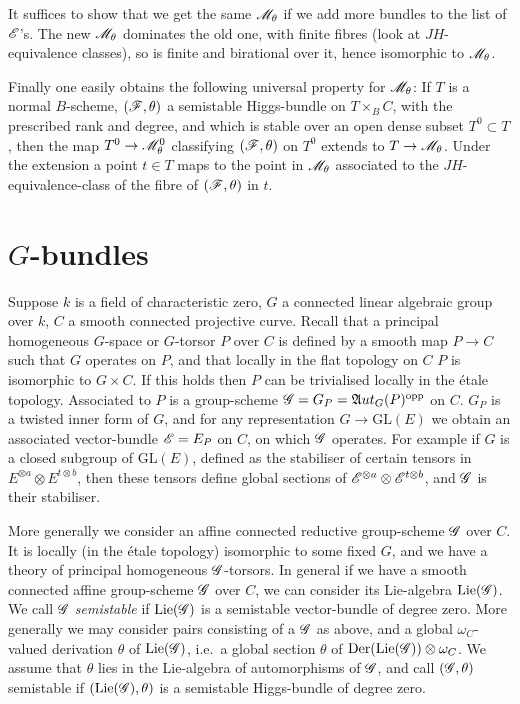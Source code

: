 \documentclass[12pt,english]{smfart}
\theoremstyle{plain} \newtheorem{innerthm}{Theorem} \newtheorem{innerlem}{Lemma} \newtheorem{innerprop}{Proposition} \newtheorem{innercor}{Corollary} \theoremstyle{definition} \newtheorem{innerdefn}{Definition} \newtheorem{innerconstr}{Construction} \theoremstyle{remark} \newtheorem*{remark}{Remark} \newtheorem*{remarks}{Remarks} \newtheorem*{applications}{Applications}
\begin{document}
It suffices to show that we get the same $\mathscr{M}_\theta$ if we add more bundles to the list of $\mathscr{E}$'s. The new $\mathscr{M}_\theta$ dominates the old one, with finite fibres (look at $JH$-equivalence classes), so is finite and birational over it, hence isomorphic to $\mathscr{M}_\theta$.

Finally one easily obtains the following universal property for $\mathscr{M}_\theta$: If $T$ is a normal $B$-scheme, $(\mathscr{F},\theta)$ a semistable Higgs-bundle on $T\times_B C$, with the prescribed rank and degree, and which is stable over an open dense subset $T^0\subset T$, then the map $T^0\to\mathscr{M}_\theta^0$ classifying $(\mathscr{F},\theta)$ on $T^0$ extends to $T\to\mathscr{M}_\theta$. Under the extension a point $t\in T$ maps to the point in $\mathscr{M}_\theta$ associated to the $JH$-equivalence-class of the fibre of $(\mathscr{F},\theta)$ in $t$.

\section{\texorpdfstring{$G$}{G}-bundles}\label{sec:II}

Suppose $k$ is a field of characteristic zero, $G$ a connected linear algebraic group over $k$, $C$ a smooth connected projective curve. Recall that a principal homogeneous $G$-space or $G$-torsor $P$ over $C$ is defined by a smooth map $P\to C$ such that $G$ operates on $P$, and that locally in the flat topology on $C$ $P$ is isomorphic to $G\times C$. If this holds then $P$ can be trivialised locally in the \'etale topology. Associated to $P$ is a group-scheme $\mathscr{G}=G_P=\mathfrak{A}ut_G(P)^{\mathrm{opp}}$ on $C$. $G_P$ is a twisted inner form of $G$, and for any representation $G\to\mathrm{GL}(E)$ we obtain an associated vector-bundle $\mathscr{E}=E_P$ on $C$, on which $\mathscr{G}$ operates. For example if $G$ is a closed subgroup of $\mathrm{GL}(E)$, defined as the stabiliser of certain tensors in $E^{\otimes a}\otimes E^{t\otimes b}$, then these tensors define global sections of $\mathscr{E}^{\otimes a}\otimes\mathscr{E}^{t\otimes b}$, and $\mathscr{G}$ is their stabiliser.

More generally we consider an affine connected reductive group-scheme $\mathscr{G}$ over $C$. It is locally (in the \'etale topology) isomorphic to some fixed
$G$, and we have a theory of principal homogeneous $\mathscr{G}$-torsors. In general if we have a smooth connected affine group-scheme $\mathscr{G}$ over $C$, we can consider its Lie-algebra $\operatorname{Lie}(\mathscr{G})$. We call $\mathscr{G}$ \emph{semistable} if $\operatorname{Lie}(\mathscr{G})$ is a semistable vector-bundle of degree zero. More generally we may consider pairs consisting of a $\mathscr{G}$ as above, and a global $\omega_C$-valued derivation $\theta$ of $\operatorname{Lie}(\mathscr{G})$, i.e.\ a global section $\theta$ of $\operatorname{Der}(\operatorname{Lie}(\mathscr{G}))\otimes\omega_C$. We assume that $\theta$ lies in the Lie-algebra of automorphisms of $\mathscr{G}$, and call $(\mathscr{G},\theta)$ semistable if $(\operatorname{Lie}(\mathscr{G}),\theta)$ is a semistable Higgs-bundle of degree zero.
\end{document}
